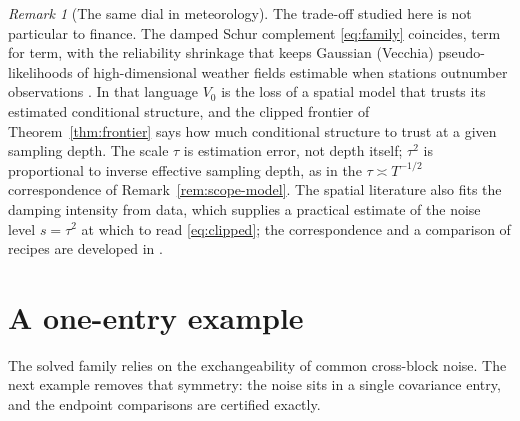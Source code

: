 \documentclass[11pt]{article}
\theoremstyle{remark}
\newtheorem{remark}{Remark}
\begin{document}
\begin{remark}[The same dial in meteorology]
\label{rem:weather}
The trade-off studied here is not particular to finance. The damped Schur
complement \eqref{eq:family} coincides, term for term, with the reliability
shrinkage that keeps Gaussian (Vecchia) pseudo-likelihoods of
high-dimensional weather fields estimable when stations outnumber
observations \cite{cotton2026damping}. In that language $V_0$ is the loss
of a spatial model that trusts its estimated conditional structure, and
the clipped frontier of Theorem~\ref{thm:frontier} says how much
conditional structure to trust at a given sampling depth. The scale $\tau$
is estimation error, not depth itself; $\tau^2$ is proportional to inverse
effective sampling depth, as in the $\tau \asymp T^{-1/2}$ correspondence
of Remark~\ref{rem:scope-model}. The spatial literature also fits the damping intensity from
data, which supplies a practical estimate of the noise level $s = \tau^2$
at which to read \eqref{eq:clipped}; the correspondence and a comparison of
recipes are developed in \cite{cotton2026damping}.
\end{remark}

\section{A one-entry example}
\label{sec:witness}

The solved family relies on the exchangeability of common cross-block
noise. The next example removes that symmetry: the noise sits in a single
covariance entry, and the endpoint comparisons are certified exactly.
\end{document}
